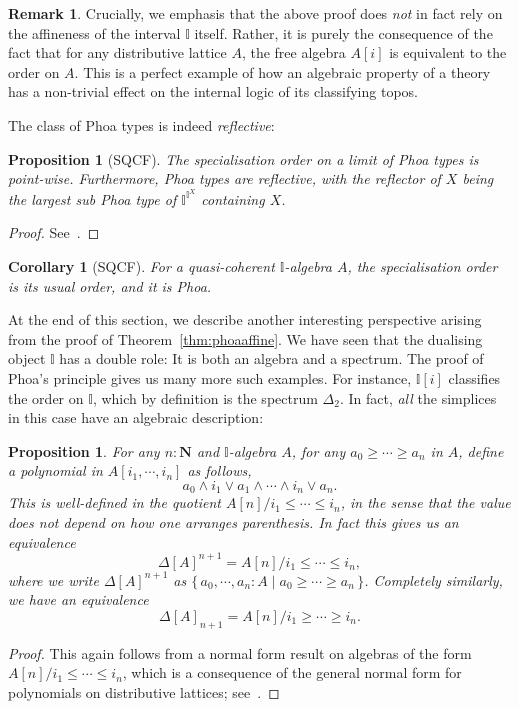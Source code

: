 \documentclass[12pt]{amsart}
\newtheorem{corollary}[theorem]{Corollary}
\newtheorem{proposition}[theorem]{Proposition}
\theoremstyle{definition}
\newtheorem{remark}[theorem]{Remark}
\newcommand{\mb}[1]{\mathbf{#1}}
\newcommand{\mbb}[1]{\mathbb{#1}}
\newcommand{\I}{\mbb I}
\newcommand{\scomp}[2]{\{\,#1\mid#2\,\}}
\newcommand{\N}{\mb N}
\begin{document}
\begin{remark}
  Crucially, we emphasis that the above proof does \emph{not} in fact rely on the affineness of the interval $\I$ itself. Rather, it is purely the consequence of the fact that for any distributive lattice $A$, the free algebra $A[i]$ is equivalent to the order on $A$. This is a perfect example of how an algebraic property of a theory has a non-trivial effect on the internal logic of its classifying topos.
\end{remark}

The class of Phoa types is indeed \emph{reflective}:

\begin{proposition}[SQCF]\label{prop:phoaexponential}
  The specialisation order on a limit of Phoa types is point-wise. Furthermore, Phoa types are reflective, with the reflector of $X$ being the largest sub Phoa type of $\I^{\I^X}$ containing $X$.
\end{proposition}
\begin{proof}
  See~\cite[Sec. 5.4]{PhoaWesleyKym-Son1991DtiR}.
\end{proof}

\begin{corollary}[SQCF]
  For a quasi-coherent $\I$-algebra $A$, the specialisation order is its usual order, and it is Phoa.
\end{corollary}

At the end of this section, we describe another interesting perspective arising from the proof of Theorem~\ref{thm:phoaaffine}. We have seen that the dualising object $\I$ has a double role: It is both an algebra and a spectrum. The proof of Phoa's principle gives us many more such examples. For instance, $\I[i]$ classifies the order on $\I$, which by definition is the spectrum $\Delta_2$. In fact, \emph{all} the simplices in this case have an algebraic description:

\begin{proposition}\label{prop:simplicesasalgebra}
  For any $n : \N$ and $\I$-algebra $A$, for any $a_0 \ge \cdots \ge a_n$ in $A$, define a polynomial in $A[i_1,\cdots,i_n]$ as follows,
  \[ a_0 \wedge i_1 \vee a_1 \wedge \cdots \wedge i_n \vee a_n. \]
  This is well-defined in the quotient $A[n]/i_1 \le \cdots \le i_n$, in the sense that the value does not depend on how one arranges parenthesis. In fact this gives us an equivalence
  \[ \Delta[A]^{n+1} = A[n]/i_1 \le \cdots \le i_n, \]
  where we write $\Delta[A]^{n+1}$ as $\scomp{a_0,\cdots,a_n : A}{a_0 \ge \cdots \ge a_n}$. Completely similarly, we have an equivalence
  \[ \Delta[A]_{n+1} = A[n]/i_1 \ge \cdots \ge i_n. \]
\end{proposition}
\begin{proof}
  This again follows from a normal form result on algebras of the form $A[n]/i_1 \le \cdots \le i_n$, which is a consequence of the general normal form for polynomials on distributive lattices; see~\cite[Thm. 10.21]{lausch2000algebra}.
\end{proof}
\end{document}
